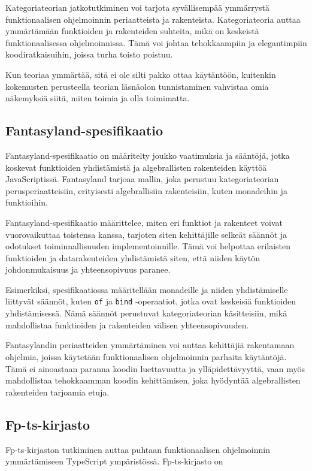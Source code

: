 Kategoriateorian jatkotutkiminen voi tarjota syvällisempää ymmärrystä funktionaalisen ohjelmoinnin periaatteista ja rakenteista. Kategoriateoria auttaa ymmärtämään funktioiden ja rakenteiden suhteita, mikä on keskeistä funktionaalisessa ohjelmoinnissa. Tämä voi johtaa tehokkaampiin ja elegantimpiin koodiratkaisuihin, joissa turha toisto poistuu.

Kun teoriaa ymmärtää, sitä ei ole silti pakko ottaa käytäntöön, kuitenkin kokemusten perusteella teorian läsnäolon tunnistaminen vahvistaa omia näkemyksiä siitä, miten toimia ja olla toimimatta.

\subsection{Fantasyland-spesifikaatio}

Fantasyland-spesifikaatio on määritelty joukko vaatimuksia ja sääntöjä, jotka koskevat funktioiden yhdistämistä ja algebrallisten rakenteiden käyttöä JavaScriptissä. Fantasyland tarjoaa mallin, joka perustuu kategoriateorian perusperiaatteisiin, erityisesti algebrallisiin rakenteisiin, kuten monadeihin ja funktioihin.

Fantasyland-spesifikaatio määrittelee, miten eri funktiot ja rakenteet voivat vuorovaikuttaa toistensa kanssa, tarjoten siten kehittäjille selkeät säännöt ja odotukset toiminnallisuuden implementoinnille. Tämä voi helpottaa erilaisten funktioiden ja datarakenteiden yhdistämistä siten, että niiden käytön johdonmukaisuus ja yhteensopivuus paranee.

Esimerkiksi, spesifikaatiossa määritellään monadeille ja niiden yhdistämiselle liittyvät säännöt, kuten \texttt{of} ja \texttt{bind} -operaatiot, jotka ovat keskeisiä funktioiden yhdistämisessä. Nämä säännöt perustuvat kategoriateorian käsitteisiin, mikä mahdollistaa funktioiden ja rakenteiden välisen yhteensopivuuden.

Fantasylandin periaatteiden ymmärtäminen voi auttaa kehittäjiä rakentamaan ohjelmia, joissa käytetään funktionaalisen ohjelmoinnin parhaita käytäntöjä. Tämä ei ainoastaan paranna koodin luettavuutta ja ylläpidettävyyttä, vaan myös mahdollistaa tehokkaamman koodin kehittämisen, joka hyödyntää algebrallisten rakenteiden tarjoamia etuja.

\subsection{Fp-ts-kirjasto}

Fp-ts-kirjaston tutkiminen auttaa puhtaan funktionaalisen ohjelmoinnin ymmärtämiseen TypeScript ympäristössä. Fp-ts-kirjasto on



